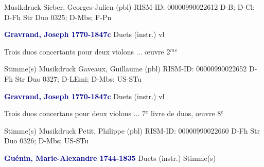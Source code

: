 \documentclass[twocolumn]{book}
\begin{document}
\newline Musikdruck
\newline Sieber, Georges-Julien  (pbl)
\newline RISM-ID: 00000990022612
\newline D-B; D-Cl; D-Fh  Str Duo 0325; D-Mbs; F-Pn
\newline \par \vspace{7pt} \textcolor{darkblue}{\textbf{Gravrand, Joseph  1770-1847c}}
\newline Duets (instr.)
 vl
\newline \begin{itshape}Trois duos concertants pour deux violons ... œuvre 2$^m$$^e$\end{itshape} 
\newline \textcolor{darkblue}{}  Stimme(s)
\newline Musikdruck
\newline Gaveaux, Guillaume  (pbl)
\newline RISM-ID: 00000990022652
\newline D-Fh  Str Duo 0327; D-LEmi; D-Mbs; US-STu
\newline \par \vspace{7pt} \textcolor{darkblue}{\textbf{Gravrand, Joseph  1770-1847c}}
\newline Duets (instr.)
 vl
\newline \begin{itshape}Trois duos concertans pour deux violons ... 7$^e$ livre de duos, œuvre 8$^e$\end{itshape} 
\newline \textcolor{darkblue}{}  Stimme(s)
\newline Musikdruck
\newline Petit, Philippe  (pbl)
\newline RISM-ID: 00000990022660
\newline D-Fh  Str Duo 0326; D-Mbs; US-STu
\newline \par \vspace{7pt} \textcolor{darkblue}{\textbf{Guénin, Marie-Alexandre  1744-1835}}
\newline Duets (instr.)
\newline \textcolor{darkblue}{}  Stimme(s)
\end{document}
